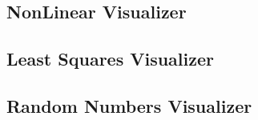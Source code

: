 \subsection{NonLinear Visualizer}

\subsection{Least Squares Visualizer}

\subsection{Random Numbers Visualizer}